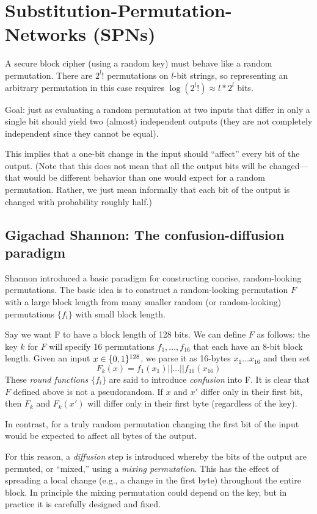 \documentclass[12pt]{article}
\begin{document}
\section{Substitution-Permutation-Networks (SPNs)}
A secure block cipher (using a random key) must behave like a random permutation. There are $2^l!$ permutations on $l$-bit strings, so representing an arbitrary permutation in this case requires $\log(2^l!) \approx l*2^l$ bits.

Goal: just as evaluating a random permutation at two inputs that diﬀer in only a single bit should yield two (almost) independent outputs (they are not completely independent since they cannot be equal).

This implies that a one-bit change in the input should “aﬀect” every bit of the output. (Note that this does not mean that all the output bits will be changed—that would be diﬀerent behavior than one would expect for a random permutation. Rather, we just mean informally that each bit of the output is changed with probability roughly half.)
\newpage
\subsection{Gigachad Shannon: The confusion-diffusion paradigm}
Shannon introduced a basic paradigm for constructing concise, random-looking permutations. The basic idea is to construct a random-looking permutation $F$ with a large block length from many smaller random (or random-looking) permutations $\{f_i\}$ with small block length.

Say we want F to have a block length of 128 bits. We can define $F$ as follows: the key $k$ for $F$ will specify 16 permutations $f_1,\dots,f_{16}$ that each have an 8-bit block length. Given an input $x \in \{0, 1\}^{128}$, we parse it as 16-bytes $x_1\dots x_{16}$ and then set
\begin{equation*}
F_k(x) = f_1(x_1)||\dots||f_{16}(x_{16})
\end{equation*}
These \emph{round functions} $\{f_i\}$ are said to introduce \emph{confusion} into F. It is clear that $F$ defined above is not a pseudorandom. If $x$ and $x'$ differ only in their first bit, then $F_k$ and $F_k(x')$ will differ only in their first byte (regardless of the key).

In contrast, for a truly random permutation changing the first bit of the input
would be expected to aﬀect all bytes of the output.

For this reason, a \emph{diﬀusion} step is introduced whereby the bits of the output
are permuted, or “mixed,” using a \emph{mixing permutation}. This has the eﬀect of spreading a local change (e.g., a change in the first byte) throughout the entire block. In principle the mixing permutation could depend on the key, but in practice it is carefully designed and fixed.
\end{document}
